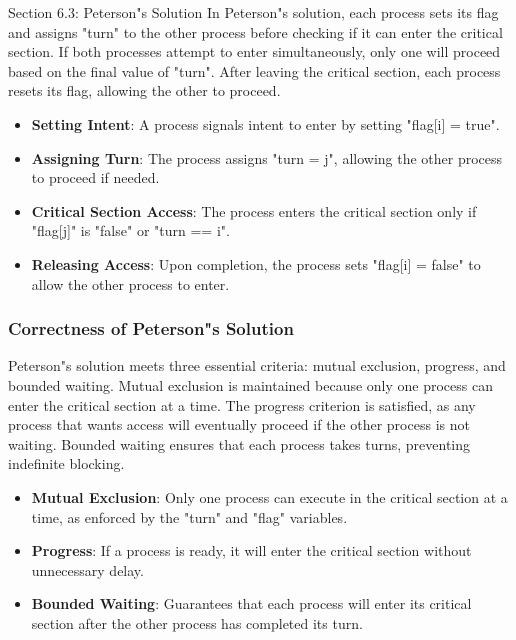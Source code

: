 \begin{notes}{Section 6.3: Peterson"s Solution}
    In Peterson"s solution, each process sets its flag and assigns "turn" to the other process before checking if it can enter the critical section. If both processes attempt to enter simultaneously, 
    only one will proceed based on the final value of "turn". After leaving the critical section, each process resets its flag, allowing the other to proceed.
    
    \begin{highlight}
    
        \begin{itemize}
            \item \textbf{Setting Intent}: A process signals intent to enter by setting "flag[i] = true".
            \item \textbf{Assigning Turn}: The process assigns "turn = j", allowing the other process to proceed if needed.
            \item \textbf{Critical Section Access}: The process enters the critical section only if "flag[j]" is "false" or "turn == i".
            \item \textbf{Releasing Access}: Upon completion, the process sets "flag[i] = false" to allow the other process to enter.
        \end{itemize}
    
    \end{highlight}
    
    \subsubsection*{Correctness of Peterson"s Solution}
    
    Peterson"s solution meets three essential criteria: mutual exclusion, progress, and bounded waiting. Mutual exclusion is maintained because only one process can enter the critical section at a time. 
    The progress criterion is satisfied, as any process that wants access will eventually proceed if the other process is not waiting. Bounded waiting ensures that each process takes turns, preventing 
    indefinite blocking.
    
    \begin{highlight}
    
        \begin{itemize}
            \item \textbf{Mutual Exclusion}: Only one process can execute in the critical section at a time, as enforced by the "turn" and "flag" variables.
            \item \textbf{Progress}: If a process is ready, it will enter the critical section without unnecessary delay.
            \item \textbf{Bounded Waiting}: Guarantees that each process will enter its critical section after the other process has completed its turn.
        \end{itemize}
    

\end{highlight}
\end{notes}
